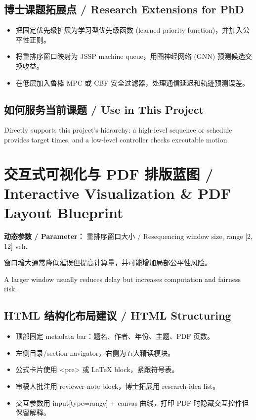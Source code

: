 \documentclass[UTF8,a4paper,11pt,fontset=fandol]{ctexart}
\begin{document}
\subsection{博士课题拓展点 / Research Extensions for PhD}
\begin{itemize}
\item 把固定优先级扩展为学习型优先级函数 (learned priority function)，并加入公平性正则。
\item 将重排序窗口映射为 JSSP machine queue，用图神经网络 (GNN) 预测候选交换收益。
\item 在低层加入鲁棒 MPC 或 CBF 安全过滤器，处理通信延迟和轨迹预测误差。
\end{itemize}


\subsection{如何服务当前课题 / Use in This Project}
Directly supports this project's hierarchy: a high-level sequence or schedule provides target times, and a low-level controller checks executable motion.

\section{交互式可视化与 PDF 排版蓝图 / Interactive Visualization \& PDF Layout Blueprint}
\textbf{动态参数 / Parameter：} 重排序窗口大小 / Resequencing window size, range [2, 12] veh.

窗口增大通常降低延误但提高计算量，并可能增加局部公平性风险。

A larger window usually reduces delay but increases computation and fairness risk.

\subsection{HTML 结构化布局建议 / HTML Structuring}
\begin{itemize}
\item 顶部固定 metadata bar：题名、作者、年份、主题、PDF 页数。
\item 左侧目录/section navigator，右侧为五大精读模块。
\item 公式卡片使用 <pre> 或 LaTeX block，紧跟符号表。
\item 审稿人批注用 reviewer-note block，博士拓展用 research-idea list。
\item 交互参数用 input[type=range] + canvas 曲线，打印 PDF 时隐藏交互控件但保留解释。
\end{itemize}
\end{document}
